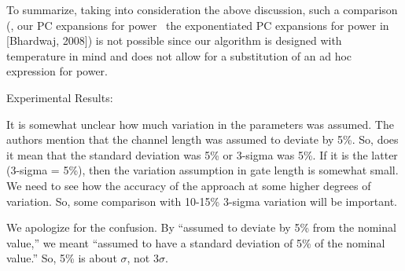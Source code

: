 \begin{authors}
To summarize, taking into consideration the above discussion, such a comparison (\ie, our PC expansions for power \vs\ the exponentiated PC expansions for power in [Bhardwaj, 2008]) is not possible since our algorithm is designed with temperature in mind and does not allow for a substitution of an ad hoc expression for power.

\begin{actions}
\end{actions}
\end{authors}

\begin{reviewer}
Experimental Results:

It is somewhat unclear how much variation in the parameters was assumed. The authors mention that the channel length was assumed to deviate by 5\%. So, does it mean that the standard deviation was 5\% or 3-sigma was 5\%. If it is the latter (3-sigma = 5\%), then the variation assumption in gate length is somewhat small. We need to see how the accuracy of the approach at some higher degrees of variation. So, some comparison with 10-15\% 3-sigma variation will be important.
\end{reviewer}
\begin{authors}
We apologize for the confusion.
By ``assumed to deviate by 5\% from the nominal value,'' we meant ``assumed to have a standard deviation of 5\% of the nominal value.''
So, 5\% is about $\sigma$, not $3 \sigma$.

\begin{actions}
\end{actions}
\end{authors}

